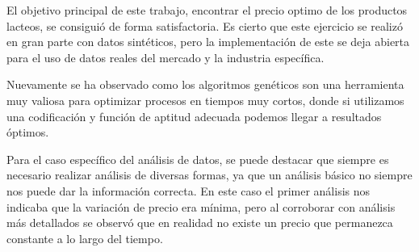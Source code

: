 El objetivo principal de este trabajo, encontrar el precio optimo de los productos lacteos, se consiguió de forma satisfactoria. Es cierto que este ejercicio se realizó en gran parte con datos sintéticos, pero la implementación de este se deja abierta para el uso de datos reales del mercado y la industria específica.

Nuevamente se ha observado como los algoritmos genéticos son una herramienta muy valiosa para optimizar procesos en tiempos muy cortos, donde si utilizamos una codificación y función de aptitud adecuada podemos llegar a resultados óptimos.

Para el caso específico del análisis de datos, se puede destacar que siempre es necesario realizar análisis de diversas formas, ya que un análisis básico no siempre nos puede dar la información correcta. En este caso el primer análisis nos indicaba que la variación de precio era mínima, pero al corroborar con análisis más detallados se observó que en realidad no existe un precio que permanezca constante a lo largo del tiempo.

